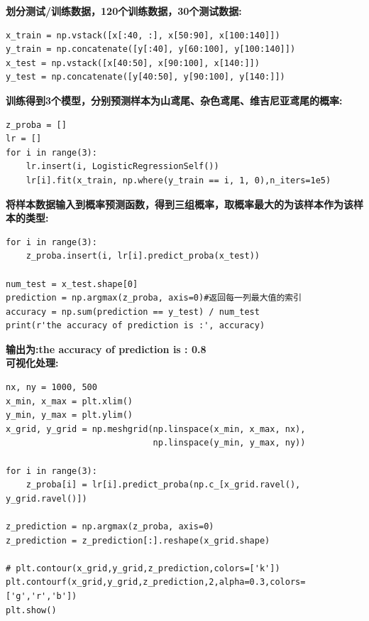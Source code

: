 \documentclass[UTF8]{article}
\begin{document}
\noindent \textbf{划分测试/训练数据，120个训练数据，30个测试数据:}
\begin{lstlisting}[style=myPython]
x_train = np.vstack([x[:40, :], x[50:90], x[100:140]])
y_train = np.concatenate([y[:40], y[60:100], y[100:140]])
x_test = np.vstack([x[40:50], x[90:100], x[140:]])
y_test = np.concatenate([y[40:50], y[90:100], y[140:]])
\end{lstlisting}
\textbf{训练得到3个模型，分别预测样本为山鸢尾、杂色鸢尾、维吉尼亚鸢尾的概率:}
\begin{lstlisting}[style=myPython]
z_proba = []
lr = []
for i in range(3):
	lr.insert(i, LogisticRegressionSelf())
	lr[i].fit(x_train, np.where(y_train == i, 1, 0),n_iters=1e5)
\end{lstlisting}
\textbf{将样本数据输入到概率预测函数，得到三组概率，取概率最大的为该样本作为该样本的类型:}
\begin{lstlisting}[style=myPython]
for i in range(3):
    z_proba.insert(i, lr[i].predict_proba(x_test))

num_test = x_test.shape[0]
prediction = np.argmax(z_proba, axis=0)#返回每一列最大值的索引
accuracy = np.sum(prediction == y_test) / num_test
print(r'the accuracy of prediction is :', accuracy)
\end{lstlisting}
\textbf{输出为:the accuracy of prediction is : 0.8}\\
\textbf{可视化处理:}
\begin{lstlisting}[style=myPython]
nx, ny = 1000, 500
x_min, x_max = plt.xlim()
y_min, y_max = plt.ylim()
x_grid, y_grid = np.meshgrid(np.linspace(x_min, x_max, nx),
							 np.linspace(y_min, y_max, ny))

for i in range(3):
	z_proba[i] = lr[i].predict_proba(np.c_[x_grid.ravel(), y_grid.ravel()])

z_prediction = np.argmax(z_proba, axis=0)
z_prediction = z_prediction[:].reshape(x_grid.shape)

# plt.contour(x_grid,y_grid,z_prediction,colors=['k'])
plt.contourf(x_grid,y_grid,z_prediction,2,alpha=0.3,colors=['g','r','b'])
plt.show()
\end{lstlisting}
\end{document}
